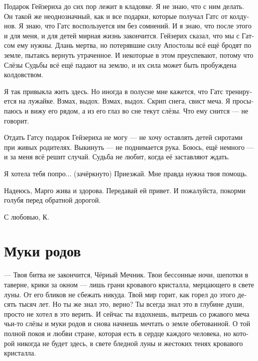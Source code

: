 \documentclass[a4paper,12pt,fleqn]{book}\usepackage{polyglossia}\setdefaultlanguage[babelshorthands=true]{russian}\setotherlanguage{english}\defaultfontfeatures{Ligatures=TeX,Mapping=tex-text}\usepackage{xcolor}\newcommand{\ml}[3]{#2}
\begin{document}
Подарок Гейзериха до сих пор лежит в кладовке.
Я не знаю, что с ним делать.
Он такой же неоднозначный, как и все подарки, которые получал Гатс от колдунов.
Я знаю, что Гатс воспользуется им без сомнений.
И я знаю, что после этого и для меня, и для детей мирная жизнь закончится.
Гейзерих сказал, что мы с Гатсом ему нужны.
Длань мертва, но потерявшие силу Апостолы всё ещё бродят по земле, пытаясь вернуть утраченное.
И некоторые в этом преуспевают, потому что Слёзы Судьбы всё ещё падают на землю, и их сила может быть пробуждена колдовством.

Я так привыкла жить здесь.
Но иногда в полусне мне кажется, что Гатс тренируется на лужайке.
Взмах, выдох. 
Взмах, выдох.
Скрип снега, свист меча.
Я просыпаюсь и вижу его рядом, а из его глаз во сне текут слёзы.
Что ему снится --- не говорит.

Отдать Гатсу подарок Гейзериха не могу --- не хочу оставлять детей сиротами при живых родителях.
Выкинуть --- не поднимается рука.
Боюсь, ещё немного --- и за меня всё решит случай.
Судьба не любит, когда её заставляют ждать.

Я хотела тебя попро... (зачёркнуто)
Приезжай.
Мне правда нужна твоя помощь.

Надеюсь, Марго жива и здорова.
Передавай ей привет.
И пожалуйста, покорми голубя перед обратной дорогой.

С любовью, К.

\section{Муки родов}

--- Твоя битва не закончится, Чёрный Мечник.
Твои бессонные ночи, шепотки в таверне, крики за окном --- лишь грани кровавого кристалла, мерцающего в свете луны.
От его бликов не сбежать никуда.
Твой мир горит, как горел до этого десять тысяч лет.
Но ты же знал это, верно?
Ты всегда знал это в глубине души, просто не хотел в это верить.
И сейчас ты вздохнешь, вытрешь со ржавого меча чьи-то слёзы и муки родов и снова начнешь мечтать о земле обетованной.
О той полной покоя и любви стране, которая есть в сердце каждого человека, но которой никогда не будет здесь, в свете бледной луны и жестоких тенях кровавого кристалла.
\end{document}
